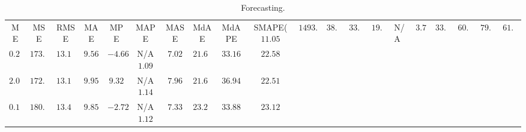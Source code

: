 \begin{table}
{\begin{tabular}{|c|c|c|c|c|c|c|c|c|c|c|}
ME &MSE &RMSE &MAE &MPE &MAPE &MASE &MdAE &MdAPE & SMAPE(%
$11.05$ & $1493.67$ & $38.65$ & $33.09$ & $19.74$ & N/A &$3.78$ & $33.65$ & $60.83$ & $79.85$ & $61.23$ \\
$0.21$ & $173.88$ & $13.19$ & \bf{$9.56$} & \bf{$-4.66$} & N/A\bf{$1.09$} & \bf{$7.02$} & $21.66$ & \bf{$33.16$} & $22.58$ \\
$2.01$ & \bf{$172.23$} & \bf{$13.12$} & $9.95$ & $9.32$ & N/A$1.14$ & $7.96$ & \bf{$21.61$} & $36.94$ & \bf{$22.51$} \\
\bf{$0.19$} & $180.75$ & $13.44$ & $9.85$ & $-2.72$ & N/A$1.12$ & $7.33$ & $23.25$ & $33.88$ & $23.12$ \\
\hline
\end{tabular}
}
\caption{Forecasting.}
\label{tab:forecasting}
\end{table}
